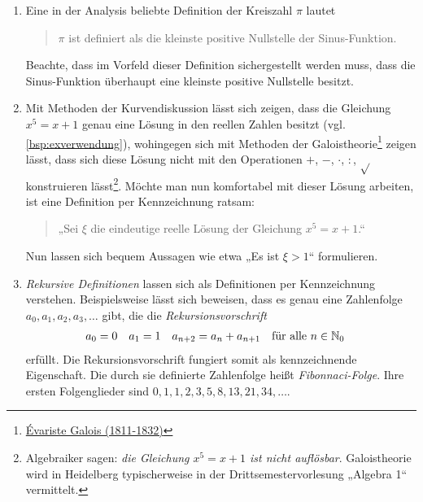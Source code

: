\begin{bsp} \label{zeichendefinieren} \quad
    \begin{enumerate}
        \item Eine in der Analysis beliebte Definition der Kreiszahl $\pi$ lautet
        \begin{quote}
            $\pi$ ist definiert als die kleinste positive Nullstelle der Sinus-Funktion.
        \end{quote}
        Beachte, dass im Vorfeld dieser Definition sichergestellt werden muss, dass die Sinus-Funktion überhaupt eine kleinste positive Nullstelle besitzt.
        \item Mit Methoden der Kurvendiskussion lässt sich zeigen, dass die Gleichung $x^5=x+1$ genau eine Lösung in den reellen Zahlen besitzt (vgl. \cref{bsp:exverwendung}), wohingegen sich mit Methoden der Galoistheorie\footnote{\href{https://de.wikipedia.org/wiki/\%C3\%89variste_Galois}{Évariste Galois (1811-1832)}} zeigen lässt, dass sich diese Lösung nicht mit den Operationen $+$, $-$, $\cdot$, $:$, $\sqrt{}$ konstruieren lässt\footnote{Algebraiker sagen: \emph{die Gleichung $x^5=x+1$ ist nicht auflösbar}. Galoistheorie wird in Heidelberg typischerweise in der Drittsemestervorlesung „Algebra 1“ vermittelt.}. Möchte man nun komfortabel mit dieser Lösung arbeiten, ist eine Definition per Kennzeichnung ratsam:
        \begin{quote}
            „Sei $\xi$ die eindeutige reelle Lösung der Gleichung $x^5=x+1$.“
        \end{quote}
        Nun lassen sich bequem Aussagen wie etwa „Es ist $\xi>1$“ formulieren.
        \item \emph{Rekursive Definitionen} lassen sich als Definitionen per Kennzeichnung verstehen. Beispielsweise lässt sich beweisen, dass es genau eine Zahlenfolge $a_0,a_1,a_2,a_3,\dots$ gibt, die die \emph{Rekursionsvorschrift}
        \begin{align*}
            a_0 & = 0 & a_1 & = 1 & a_{n+2} & = a_n+a_{n+1}  && \text{für alle}\ n\in \mathbb N_0
        \end{align*}
        erfüllt. Die Rekursionsvorschrift fungiert somit als kennzeichnende Eigenschaft. Die durch sie definierte Zahlenfolge heißt \emph{Fibonnaci-Folge}. Ihre ersten Folgenglieder sind $0,1,1,2,3,5,8,13,21,34,\dots$.
    \end{enumerate}
\end{bsp}


